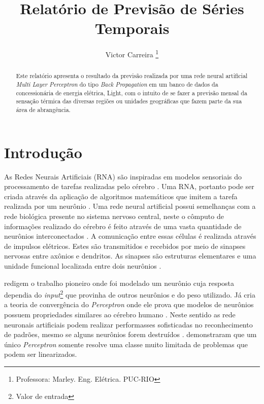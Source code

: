 \documentclass[journal, a4paper]{IEEEtran}
\begin{document}
	\title{Relatório de Previsão de Séries Temporais}
	\author{Victor Carreira
	\thanks{Professora: Marley. Eng. Elétrica. PUC-RIO}}
	\maketitle

\begin{abstract}
	Este relatório apresenta o resultado da previsão realizada por uma rede neural artificial \textit{Multi Layer Perceptron} do tipo \textit{Back Propagation} em um banco de dados da concessionária de energia elétrica, Light, com o intuito de se fazer a previsão mensal da sensação térmica das diversas regiões ou unidades geográficas que fazem parte da sua área de abrangência. 
\end{abstract}


\section{Introdução}
    As Redes Neurais Artificiais (RNA) são inspiradas em modelos sensoriais do processamento de tarefas realizadas pelo cérebro \citep{Hagan1996}. Uma RNA, portanto pode ser criada através da aplicação de algoritmos matemáticos que imitem a tarefa realizada por um neurônio \citep{Nedjah2016}. Uma rede neural artificial possui semelhanças com a rede biológica presente no sistema nervoso central, neste o cômputo de informações realizado do cérebro é feito através de uma vasta quantidade de neurônios interconectados \citep{Feldman1988,Poulton2002}. A comunicação entre essas células é realizada através de impulsos elétricos. Estes são transmitidos e recebidos por meio de sinapses nervosas entre axônios e dendritos. As sinapses são estruturas elementares e uma unidade funcional localizada entre dois neurônios \citep{Krogh2008}.

	\citet{McCulloch1943} redigem o trabalho pioneiro onde foi modelado um neurônio cuja resposta dependia do \textit{input}\footnote{Valor de entrada} que provinha de outros neurônios e do peso utilizado.  Já \citet{Rosenblatt1962} cria a teoria de convergência do \textit{Perceptron} onde ele prova que modelos de neurônios possuem propriedades similares ao cérebro humano \citep{Kanal2001}. Neste sentido as rede neuronais artificiais podem realizar performasses sofisticadas no reconhecimento de padrões, mesmo se alguns neurônios forem destruídos \citep{Levy1997}. \citet{Minsky1969} demonstraram que um único  \textit{Perceptron} somente resolve uma classe muito limitada de problemas que podem ser linearizados.
	
\end{document}
